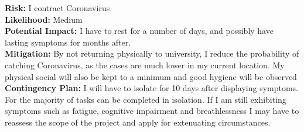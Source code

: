 \noindent \textbf{Risk:} I contract Coronavirus\\
\textbf{Likelihood:} Medium\\
\textbf{Potential Impact:} I have to rest for a number of days, and possibly
have lasting symptoms for months after. \cite{Sudre2020LongCorona}\\
\textbf{Mitigation:} By not returning physically to university, I reduce the
probability of catching Coronavirus, as the cases are much lower in my current
location. My physical social will also be kept to a minimum and good hygiene
will be observed\\
\textbf{Contingency Plan:} I will have to isolate for 10 days after displaying
symptoms. For the majority of tasks can be completed in isolation. If I am still
exhibiting symptoms such as fatigue, cognitive impairment and breathlessness I may
have to reassess the scope of the project and apply for extenuating circumstances.\par







